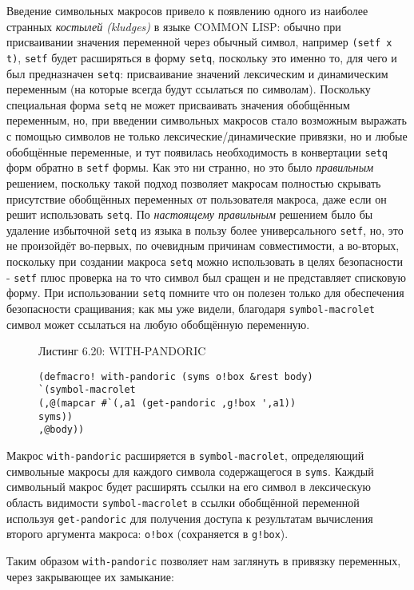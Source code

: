 Введение символьных макросов привело к появлению одного из наиболее странных \emph{костылей (kludges)} в языке COMMON LISP: обычно при присваивании значения переменной через обычный символ, например \verb"(setf x t)", \verb"setf" будет расширяться в форму \verb"setq", поскольку это именно то, для чего и был предназначен \verb"setq": присваивание значений лексическим и динамическим переменным (на которые всегда будут ссылаться по символам). Поскольку специальная форма \verb"setq" не может присваивать значения обобщённым переменным, но, при введении символьных макросов стало возможным выражать с помощью символов не только лексические/динамические привязки, но и любые обобщённые переменные, и тут появилась необходимость в конвертации \verb"setq" форм обратно в \verb"setf" формы. Как это ни странно, но это было \emph{правильным} решением, поскольку такой подход позволяет макросам полностью скрывать присутствие обобщённых переменных от пользователя макроса, даже если он решит использовать \verb"setq". По \emph{настоящему правильным} решением было бы удаление избыточной \verb"setq" из языка в пользу более универсального \verb"setf", но, это не произойдёт во-первых, по очевидным причинам совместимости, а во-вторых, поскольку при создании макроса \verb"setq" можно использовать в целях безопасности - \verb"setf" плюс проверка на то что символ был сращен и не представляет списковую форму. При использовании \verb"setq" помните что он полезен только для обеспечения безопасности сращивания; как мы уже видели, благодаря \verb"symbol-macrolet" символ может ссылаться на любую обобщённую переменную.

\begin{figure}Листинг 6.20: WITH-PANDORIC\label{listing_6.20}
\listbegin
\begin{verbatim}
(defmacro! with-pandoric (syms o!box &rest body)
`(symbol-macrolet
(,@(mapcar #`(,a1 (get-pandoric ,g!box ',a1))
syms))
,@body))
\end{verbatim}
\listend
\end{figure}

Макрос \verb"with-pandoric" расширяется в \verb"symbol-macrolet", определяющий символьные макросы для каждого символа содержащегося в \verb"syms". Каждый символьный макрос будет расширять ссылки на его символ в лексическую область видимости \verb"symbol-macrolet" в ссылки обобщённой переменной используя \verb"get-pandoric" для получения доступа к результатам вычисления второго аргумента макроса: \verb"o!box" (сохраняется в \verb"g!box").

Таким образом \verb"with-pandoric" позволяет нам заглянуть в привязку переменных, через закрывающее их замыкание:

